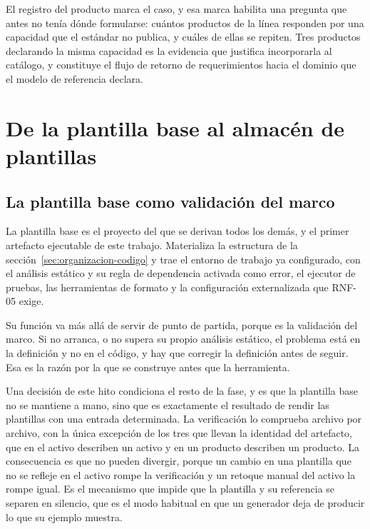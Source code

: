 El registro del producto marca el caso, y esa marca habilita una pregunta que
antes no tenía dónde formularse: cuántos productos de la línea responden por
una capacidad que el estándar no publica, y cuáles de ellas se repiten. Tres
productos declarando la misma capacidad es la evidencia que justifica
incorporarla al catálogo, y constituye el flujo de retorno de requerimientos
hacia el dominio que el modelo de referencia declara.

\section{De la plantilla base al almacén de plantillas}
\label{sec:almacen}

\subsection{La plantilla base como validación del marco}
\label{sec:activo-base}

La plantilla base es el proyecto del que se derivan todos los demás, y el
primer artefacto ejecutable de este trabajo. Materializa la estructura de la
sección~\ref{sec:organizacion-codigo} y trae el entorno de trabajo ya
configurado, con el análisis estático y su regla de dependencia activada como
error, el ejecutor de pruebas, las herramientas de formato y la configuración
externalizada que RNF-05 exige.

Su función va más allá de servir de punto de partida, porque es la validación
del marco. Si no arranca, o no supera su propio análisis estático, el problema
está en la definición y no en el código, y hay que corregir la definición
antes de seguir. Esa es la razón por la que se construye antes que la
herramienta.

Una decisión de este hito condiciona el resto de la fase, y es que la plantilla
base no se mantiene a mano, sino que es exactamente el resultado de rendir las
plantillas con una entrada determinada. La verificación lo comprueba archivo
por archivo, con la única excepción de los tres que llevan la identidad del
artefacto, que en el activo describen un activo y en un producto describen un
producto. La consecuencia es que no pueden divergir, porque un cambio en una
plantilla que no se refleje en el activo rompe la verificación y un retoque
manual del activo la rompe igual. Es el mecanismo que impide que la plantilla
y su referencia se separen en silencio, que es el modo habitual en que un
generador deja de producir lo que su ejemplo muestra.

